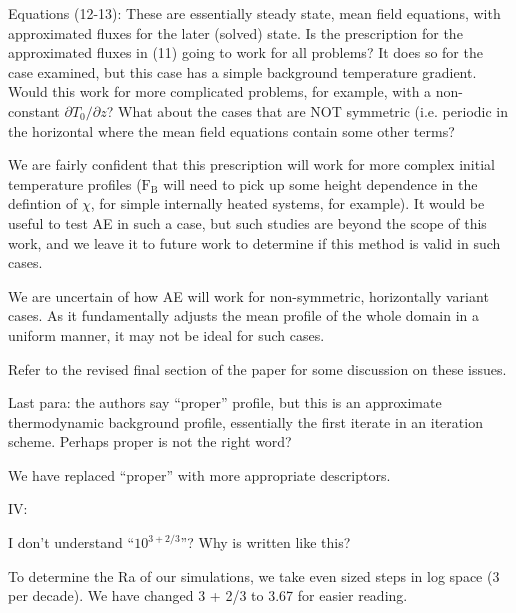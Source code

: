 \documentclass[aps, 11pt, singlecolumn]{revtex4-1} %
\begin{document}
\begin{singlespace}
\begin{myquotation}
Equations (12-13): These are essentially steady state, mean field
equations, with approximated fluxes for the later (solved) state. Is
the prescription for the approximated fluxes in (11) going to work for
all problems? It does so for the case examined, but this case has a
simple background temperature gradient. Would this work for more
complicated problems, for example, with a non-constant $\partial T_0/\partial z$? What
about the cases that are NOT symmetric (i.e. periodic in the
horizontal where the mean field equations contain some other terms?
\end{myquotation}
We are fairly confident that this prescription will work for more complex
initial temperature profiles ($\text{F}_{\text{B}}$ will need to pick up some
height dependence in the defintion of $\chi$, for simple internally heated
systems, for example). It would be useful to test AE in such a case, but such
studies are beyond the scope of this work, and we leave it to future work
to determine if this method is valid in such cases.   

We are uncertain of 
how AE will work for non-symmetric, horizontally variant cases. As it fundamentally
adjusts the mean profile of the whole domain in a uniform manner, it may not be
ideal for such cases. 

Refer to the revised final section of the paper for some discussion on these
issues.

\begin{myquotation}
Last para: the authors say “proper” profile, but this is an
approximate thermodynamic background profile, essentially the first
iterate in an iteration scheme. Perhaps proper is not the right word?
\end{myquotation}
We have replaced ``proper'' with more appropriate descriptors.

\begin{myquotation}
IV:

I don’t understand ``$10^{3+2/3}$''? Why is written like this?
\end{myquotation}
To determine the Ra of our simulations, we take even sized steps in log space
(3 per decade). We have changed 3 + 2/3 to 3.67 for easier reading.



\end{singlespace}
\end{document}
